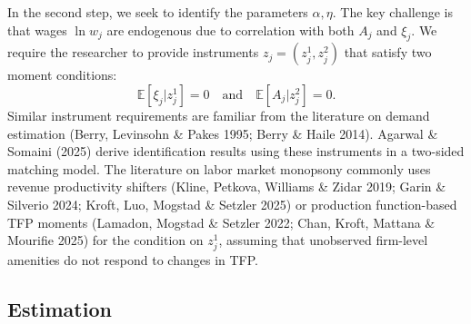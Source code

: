 \documentclass[11pt]{article}
\begin{document}
In the second step, we seek to identify the parameters $\alpha, \eta$. The key challenge is that wages $\ln w_j$ are endogenous due to correlation with both $A_j$ and $\xi_j$. We require the researcher to provide instruments $z_j = (z_j^1, z_j^2)$ that satisfy two moment conditions:
\[   \mathbb E[\xi_j | z_j^1]=0 \quad \text{and} \quad \mathbb E[A_j|z_j^2] =0.\]
Similar instrument requirements are familiar from the literature on demand estimation (Berry, Levinsohn \& Pakes 1995; Berry \& Haile 2014). Agarwal \& Somaini (2025) derive identification results using these instruments in a two-sided matching model. The literature on labor market monopsony commonly uses revenue productivity shifters (Kline, Petkova, Williams \& Zidar 2019; Garin \& Silverio 2024; Kroft, Luo, Mogstad \& Setzler 2025) or production function-based TFP moments (Lamadon, Mogstad \& Setzler 2022; Chan, Kroft, Mattana \& Mourifie 2025) for the condition on $z_j^1$, assuming that unobserved firm-level amenities do not respond to changes in TFP.

\subsection{Estimation}
\end{document}
